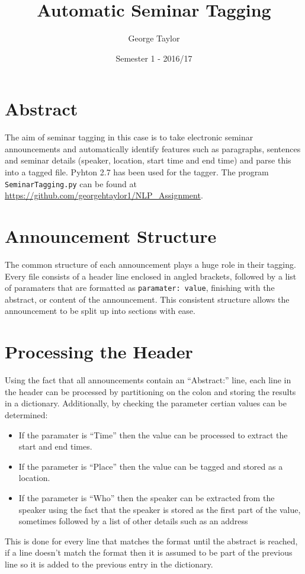 \documentclass[draft]{article}
\title{Automatic Seminar Tagging}
\author{George Taylor}
\date{Semester 1 - 2016/17}
\begin{document}
\nocite{*}


\maketitle
\begin{multicols*}{2}

\section*{Abstract}
The aim of seminar tagging in this case is to take electronic seminar announcements and automatically identify features such as paragraphs, sentences and seminar details (speaker, location, start time and end time) and parse this into a tagged file. Pyhton 2.7 has been used for the tagger. The program \texttt{SeminarTagging.py} can be found at \href{https://github.com/georgehtaylor1/NLP_Assignment}{https://github.com/georgehtaylor1/NLP\_Assignment}.

\section*{Announcement Structure}
The common structure of each announcement plays a huge role in their tagging. Every file consists of a header line enclosed in angled brackets, followed by a list of paramaters that are formatted as \texttt{paramater: value}, finishing with the abstract, or content of the announcement. This consistent structure allows the announcement to be split up into sections with ease.

\section*{Processing the Header}
Using the fact that all announcements contain an ``Abstract:'' line, each line in the header can be processed by partitioning on the colon and storing the results in a dictionary. Additionally, by checking the parameter certian values can be determined:
\begin{itemize}
\item If the paramater is ``Time'' then the value can be processed to extract the start and end times.
\item If the parameter is ``Place'' then the value can be tagged and stored as a location.
\item If the parameter is ``Who'' then the speaker can be extracted from the speaker using the fact that the speaker is stored as the first part of the value, sometimes followed by a list of other details such as an address
\end{itemize}
This is done for every line that matches the format until the abstract is reached, if a line doesn't match the format then it is assumed to be part of the previous line so it is added to the previous entry in the dictionary.


\end{multicols*}
\end{document}
